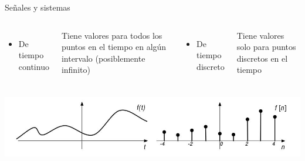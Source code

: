 \documentclass{beamer}
\begin{document}
\begin{darkframes}
\begin{frame}{Señales y sistemas}
      \begin{columns}[onlytextwidth]
            \begin{itemize}
               \item{De tiempo continuo}
      \end{itemize}
            Tiene valores para todos los puntos en el tiempo en algún intervalo (posiblemente infinito)
            \begin{itemize}
               \item{De tiempo discreto}
            \end{itemize}
         Tiene valores solo para puntos discretos en el tiempo
         \end{columns}
      \vfill
      \includegraphics[width=\textwidth]{1_clase/continuo_vs_discreto}
    \end{frame}


\end{darkframes}
\end{document}
